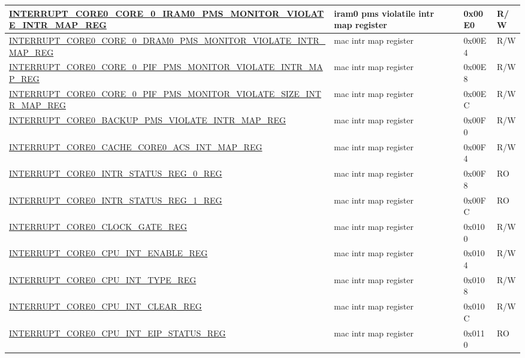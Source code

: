 \begin{longtable}{ | p{6cm} | p{7.2cm} | p{1.3cm} | p{1cm} | }
\hyperref[regdesc:INTERRUPTCORE0CORE0IRAM0PMSMONITORVIOLATEINTRMAPREG]{INTERRUPT\_CORE0\_CORE\_0\_IRAM0\_PMS\_MONITOR\_VIOLATE\_INTR\_MAP\_REG} & iram0 pms violatile intr map register & 0x00E0 & R/W \\ \hline
\hyperref[regdesc:INTERRUPTCORE0CORE0DRAM0PMSMONITORVIOLATEINTRMAPREG]{INTERRUPT\_CORE0\_CORE\_0\_DRAM0\_PMS\_MONITOR\_VIOLATE\_INTR\_MAP\_REG} & mac intr map register & 0x00E4 & R/W \\ \hline
\hyperref[regdesc:INTERRUPTCORE0CORE0PIFPMSMONITORVIOLATEINTRMAPREG]{INTERRUPT\_CORE0\_CORE\_0\_PIF\_PMS\_MONITOR\_VIOLATE\_INTR\_MAP\_REG} & mac intr map register & 0x00E8 & R/W \\ \hline
\hyperref[regdesc:INTERRUPTCORE0CORE0PIFPMSMONITORVIOLATESIZEINTRMAPREG]{INTERRUPT\_CORE0\_CORE\_0\_PIF\_PMS\_MONITOR\_VIOLATE\_SIZE\_INTR\_MAP\_REG} & mac intr map register & 0x00EC & R/W \\ \hline
\hyperref[regdesc:INTERRUPTCORE0BACKUPPMSVIOLATEINTRMAPREG]{INTERRUPT\_CORE0\_BACKUP\_PMS\_VIOLATE\_INTR\_MAP\_REG} & mac intr map register & 0x00F0 & R/W \\ \hline
\hyperref[regdesc:INTERRUPTCORE0CACHECORE0ACSINTMAPREG]{INTERRUPT\_CORE0\_CACHE\_CORE0\_ACS\_INT\_MAP\_REG} & mac intr map register & 0x00F4 & R/W \\ \hline
\hyperref[regdesc:INTERRUPTCORE0INTRSTATUSREG0REG]{INTERRUPT\_CORE0\_INTR\_STATUS\_REG\_0\_REG} & mac intr map register & 0x00F8 & RO \\ \hline
\hyperref[regdesc:INTERRUPTCORE0INTRSTATUSREG1REG]{INTERRUPT\_CORE0\_INTR\_STATUS\_REG\_1\_REG} & mac intr map register & 0x00FC & RO \\ \hline
\hyperref[regdesc:INTERRUPTCORE0CLOCKGATEREG]{INTERRUPT\_CORE0\_CLOCK\_GATE\_REG} & mac intr map register & 0x0100 & R/W \\ \hline
\hyperref[regdesc:INTERRUPTCORE0CPUINTENABLEREG]{INTERRUPT\_CORE0\_CPU\_INT\_ENABLE\_REG} & mac intr map register & 0x0104 & R/W \\ \hline
\hyperref[regdesc:INTERRUPTCORE0CPUINTTYPEREG]{INTERRUPT\_CORE0\_CPU\_INT\_TYPE\_REG} & mac intr map register & 0x0108 & R/W \\ \hline
\hyperref[regdesc:INTERRUPTCORE0CPUINTCLEARREG]{INTERRUPT\_CORE0\_CPU\_INT\_CLEAR\_REG} & mac intr map register & 0x010C & R/W \\ \hline
\hyperref[regdesc:INTERRUPTCORE0CPUINTEIPSTATUSREG]{INTERRUPT\_CORE0\_CPU\_INT\_EIP\_STATUS\_REG} & mac intr map register & 0x0110 & RO \\ \hline

\end{longtable}
